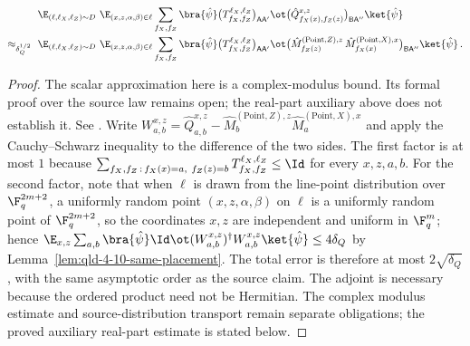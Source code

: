 \begin{lemma}
	\label{lem:claim-17-1}
	\notready
	\begin{align*}
		\E_{(\ell,\ell_X,\ell_Z) \sim D}\
		\E_{(x,z,\alpha,\beta) \in \ell}
		&\sum_{f_X,f_Z} \bra{\hat\psi}
		\big(T^{\ell_X,\ell_Z}_{f_X,f_Z}\big)_{\mathsf{A}\mathsf{A}'} \ot
		\big(\hat{Q}^{x,z}_{f_X(x),f_Z(z)}\big)_{\mathsf{B}\mathsf{A}''}
		\ket{\hat\psi} \\
		\approx_{\delta_Q^{1/2}}\
		\E_{(\ell,\ell_X,\ell_Z) \sim D}\
		\E_{(x,z,\alpha,\beta) \in \ell}
		&\sum_{f_X,f_Z} \bra{\hat\psi}
		\big(T^{\ell_X,\ell_Z}_{f_X,f_Z}\big)_{\mathsf{A}\mathsf{A}'} \ot
		\big(\hat{M}^{(\mathrm{Point},Z),z}_{f_Z(z)} \,
		\hat{M}^{(\mathrm{Point},X),x}_{f_X(x)}
		\big)_{\mathsf{B}\mathsf{A}''}
		\ket{\hat\psi}\,.
	\end{align*}
\end{lemma}
\begin{proof}
	The scalar approximation here is a complex-modulus bound. Its formal
	proof over the source law remains open; the real-part auxiliary above
	does not establish it. See \cite{gap:qpbt_subline-claims-line-marginal}.
	Write
	$W^{x,z}_{a,b} = \hat{Q}^{x,z}_{a,b}
	- \hat{M}^{(\mathrm{Point},Z),z}_{b}
	\hat{M}^{(\mathrm{Point},X),x}_{a}$
	and apply the Cauchy--Schwarz inequality to the difference of the two
	sides. The first factor is at most $1$ because
	$\sum_{f_X,f_Z \,:\, f_X(x)=a,\ f_Z(z)=b}
	T^{\ell_X,\ell_Z}_{f_X,f_Z} \le \Id$
	for every $x, z, a, b$. For the second factor, note that when $\ell$ is
	drawn from the line-point distribution over $\F_q^{2m+2}$, a uniformly
	random point $(x,z,\alpha,\beta)$ on $\ell$ is a uniformly random point
	of $\F_q^{2m+2}$, so the coordinates $x, z$ are independent and uniform
	in $\F_q^m$; hence
	$\E_{x,z} \sum_{a,b}
	\bra{\hat\psi} \Id \ot (W^{x,z}_{a,b})^\dagger W^{x,z}_{a,b}
	\ket{\hat\psi}\le4\delta_Q$
	by Lemma~\ref{lem:qld-4-10-same-placement}. The total error is therefore
	at most $2\sqrt{\delta_Q}$, with the same asymptotic order as the
	source claim. The adjoint is necessary because the ordered product need
	not be Hermitian. The complex modulus estimate and source-distribution
	transport remain separate obligations; the proved auxiliary real-part
	estimate is stated below.
\end{proof}

